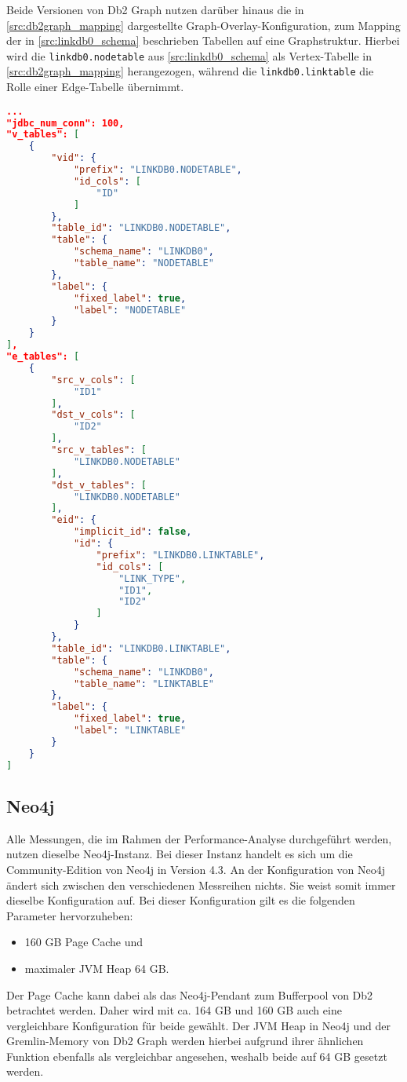 Beide Versionen von Db2 Graph nutzen darüber hinaus die in \autoref{src:db2graph_mapping} dargestellte Graph-Overlay-Konfiguration, zum Mapping der in \autoref{src:linkdb0_schema} beschrieben Tabellen auf eine Graphstruktur. Hierbei wird die \texttt{linkdb0.nodetable} aus \autoref{src:linkdb0_schema} als Vertex-Tabelle in \autoref{src:db2graph_mapping} herangezogen, während die \texttt{linkdb0.linktable} die Rolle einer Edge-Tabelle übernimmt. 
\begin{lstlisting}[label=src:db2graph_mapping,caption={Graph-Overlay-Konfiguration Db2 Graph},language=json]
...
"jdbc_num_conn": 100,
"v_tables": [
    {
        "vid": {
            "prefix": "LINKDB0.NODETABLE",
            "id_cols": [
                "ID"
            ]
        },
        "table_id": "LINKDB0.NODETABLE",
        "table": {
            "schema_name": "LINKDB0",
            "table_name": "NODETABLE"
        },
        "label": {
            "fixed_label": true,
            "label": "NODETABLE"
        }
    }
],
"e_tables": [
    {
        "src_v_cols": [
            "ID1"
        ],
        "dst_v_cols": [
            "ID2"
        ],
        "src_v_tables": [
            "LINKDB0.NODETABLE"
        ],
        "dst_v_tables": [
            "LINKDB0.NODETABLE"
        ],
        "eid": {
            "implicit_id": false,
            "id": {
                "prefix": "LINKDB0.LINKTABLE",
                "id_cols": [
                    "LINK_TYPE",
                    "ID1",
                    "ID2"
                ]
            }
        },
        "table_id": "LINKDB0.LINKTABLE",
        "table": {
            "schema_name": "LINKDB0",
            "table_name": "LINKTABLE"
        },
        "label": {
            "fixed_label": true,
            "label": "LINKTABLE"
        }
    }
]
\end{lstlisting}

\subsection{Neo4j}
Alle Messungen, die im Rahmen der Performance-Analyse durchgeführt werden, nutzen dieselbe Neo4j-Instanz. Bei dieser Instanz handelt es sich um die Community-Edition von Neo4j in Version 4.3. An der Konfiguration von Neo4j ändert sich zwischen den verschiedenen Messreihen nichts. Sie weist somit immer dieselbe Konfiguration auf. Bei dieser Konfiguration gilt es die folgenden Parameter hervorzuheben: 
\begin{itemize}
    \item 160 GB Page Cache und
    \item maximaler JVM Heap 64 GB.
\end{itemize}
Der Page Cache kann dabei als das Neo4j-Pendant zum Bufferpool von Db2 betrachtet werden. Daher wird mit ca. 164 GB und 160 GB auch eine vergleichbare Konfiguration für beide gewählt. Der JVM Heap in Neo4j und der Gremlin-Memory von Db2 Graph werden hierbei aufgrund ihrer ähnlichen Funktion ebenfalls als vergleichbar angesehen, weshalb beide auf 64 GB gesetzt werden.

